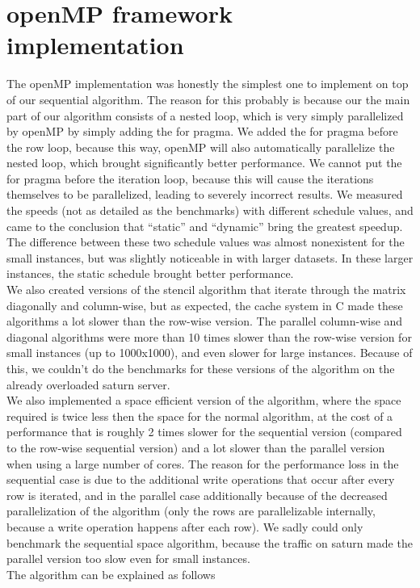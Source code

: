 \documentclass[11pt]{article}
\begin{document}
\section{openMP framework implementation}
The openMP implementation was honestly the simplest one to implement on top of our sequential algorithm. The reason for this probably is because our
the main part of our algorithm consists of a nested loop, which is very simply parallelized by openMP by simply adding the for pragma. We added the for pragma before the 
row loop, because this way, openMP will also automatically parallelize the nested loop, which brought significantly better performance. We cannot put the for pragma before the
iteration loop, because this will cause the iterations themselves to be parallelized, leading to severely incorrect results. We measured the speeds (not as detailed as the benchmarks)
with different schedule values, and came to the conclusion that ``static'' and ``dynamic'' bring the greatest speedup. The difference between these two schedule values
was almost nonexistent for the small instances, but was slightly noticeable in with larger datasets. In these larger instances, the static schedule brought better performance.\\
We also created versions of the stencil algorithm that iterate through the matrix diagonally and column-wise, but as expected, the cache system in C made these algorithms a lot 
slower than the row-wise version. The parallel column-wise and diagonal algorithms were more than 10 times slower than the row-wise version for small instances (up to 1000x1000),
and even slower for large instances. Because of this, we couldn't do the benchmarks for these versions of the algorithm on the already overloaded saturn server.\\
We also implemented a space efficient version of the algorithm, where the space required is twice less then the space for the normal algorithm, at the cost of a performance that is roughly 
2 times slower for the sequential version (compared to the row-wise sequential version) and a lot slower than the parallel version when using a large number of cores. The reason for the performance loss
in the sequential case is due to the additional write operations that occur after every row is iterated, and in the parallel case additionally because of the decreased parallelization of the algorithm (only the rows
are parallelizable internally, because a write operation happens after each row). We sadly could only benchmark the sequential space algorithm, because the traffic on saturn made the parallel version too slow even for small instances.\\
The algorithm can be explained as follows
\end{document}
